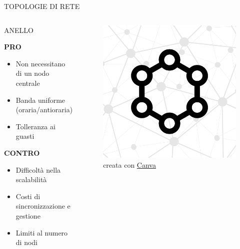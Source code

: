 \documentclass[aspectratio=1610]{beamer}
\begin{document}
\begin{frame}{TOPOLOGIE DI RETE}
    \begin{columns}
            \justifying
            \begin{alertblock}{ANELLO}
                \begin{minipage}{0.96\linewidth}
                    \justifying
                    \textbf{PRO}
                    \begin{itemize}
                        \item Non necessitano di un nodo centrale
                        \pause
                        \item Banda uniforme (oraria/antioraria)
                        \pause
                        \item Tolleranza ai guasti
                    \end{itemize}
                    \pause
                    \textbf{CONTRO}
                    \begin{itemize}
                        \item Difficoltà nella scalabilità
                        \pause
                        \item Costi di sincronizzazione e gestione
                        \pause
                        \item Limiti al numero di nodi
                    \end{itemize}
                \end{minipage}
            \end{alertblock}
            \begin{figure}
                \includegraphics[width=\linewidth]{img/anello.png}
                \caption{{creata con \href{https://www.canva.com/}{Canva}}}
            \end{figure}
    \end{columns}
\end{frame}
\end{document}
